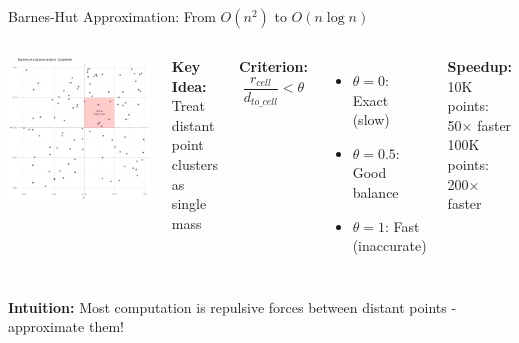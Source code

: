 \documentclass[aspectratio=169]{beamer}
\newcommand{\intuition}[1]{\colorbox{green!10}{\textcolor{intuitioncolor}{\textbf{Intuition:} #1}}}
\begin{document}
\begin{frame}{Barnes-Hut Approximation: From $O(n^2)$ to $O(n\log n)$}
\begin{columns}
\includegraphics[width=\textwidth]{./Figures/barnes_hut_tree.png}

\textbf{Key Idea:}\\
Treat distant point clusters as single mass

\textbf{Criterion:}
$$\frac{r_{cell}}{d_{to\_cell}} < \theta$$

\begin{itemize}
\item $\theta = 0$: Exact (slow)
\item $\theta = 0.5$: Good balance
\item $\theta = 1$: Fast (inaccurate)
\end{itemize}

\textbf{Speedup:}\\
10K points: 50× faster\\
100K points: 200× faster
\end{columns}

\intuition{Most computation is repulsive forces between distant points - approximate them!}
\end{frame}
\end{document}
